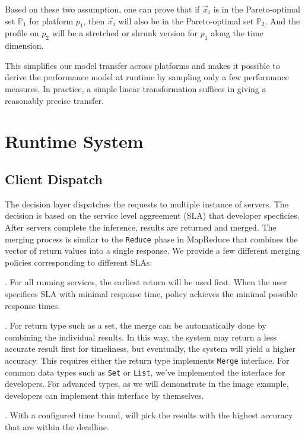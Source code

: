 Based on these two assumption, one can prove that if $\vec{x}_i$ is in the
Pareto-optimal set $\mathbb{P}_1$ for platform $p_1$, then $\vec{x}_i$ will also
be in the Pareto-optimal set $\mathbb{P}_2$. And the profile on $p_2$ will be a
stretched or shrunk version for $p_1$ along the time dimension.

This simplifies our model transfer across platforms and makes it possible to
derive the performance model at runtime by sampling only a few performance
measures. In practice, a simple linear transformation suffices in giving a
reasonably precise transfer.

\section{Runtime System}
\label{sec:runtime-system}

\subsection{Client Dispatch}

The decision layer dispatches the requests to multiple instance of servers. The
decision is based on the service level aggreement (SLA) that developer
specficies. After servers complete the inference, results are returned and
merged. The merging process is similar to the \texttt{Reduce} phase in MapReduce
that combines the vector of return values into a single response. We provide a
few different merging policies corresponding to different SLAs:

. For all running services, the earliest return will be
used first. When the user specifices SLA with minimal response time, policy
achieves the minimal possible response times.

. For return type such as a set, the merge can be
automatically done by combining the individual results. In this way, the system
may return a less accurate result first for timeliness, but eventually, the
system will yield a higher accuracy. This requires either the return type
implements \texttt{Merge} interface. For common data types such as \texttt{Set}
or \texttt{List}, we've implemented the interface for developers. For advanced
types, as we will demonstrate in the image example, developers can implement
this interface by themselves.

. With a configured time bound, \sysname{} will pick the
results with the highest accuracy that are within the deadline.

